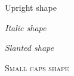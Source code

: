 \documentclass[a4paper,12pt]{article}
\begin{document}
	\textup{Upright shape}\par	
	\textit{Italic shape}\par
	\textsl{Slanted shape}\par
	\textsc{Small caps shape}
	
	
\end{document}
